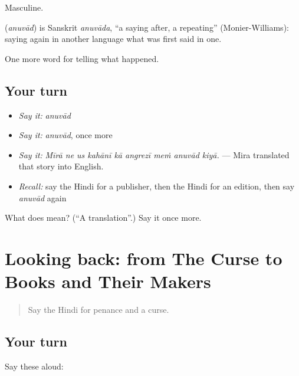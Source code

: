 Masculine.

\begin{cousinweb}
\textbf{} (\emph{anuvād}) is Sanskrit \emph{anuvāda}, \textquotedblleft{}a saying after, a repeating\textquotedblright{} (Monier-Williams): saying again in another language what was first said in one.
\end{cousinweb}

\begin{grammarlens}[title={What you've built}]
One more word for telling what happened.
\end{grammarlens}

\subsection*{Your turn}
\begin{itemize}
\raggedright
  \item \emph{Say it:} \emph{anuvād}
  \item \emph{Say it:} \emph{anuvād}, once more
  \item \emph{Say it:} \emph{Mīrā ne us kahānī kā angrezī meṁ anuvād kiyā.} — Mira translated that story into English.
  \item \emph{Recall:} say the Hindi for a publisher, then the Hindi for an edition, then say \emph{anuvād} again
\end{itemize}

\begin{tcolorbox}[breakable,colback=teal!4,colframe=teal!35!black,title={Before you move on}]
What does  mean? (\textquotedblleft{}A translation\textquotedblright{}.) Say it once more.
\end{tcolorbox}
\section[(dialogue)]{Looking back: from The Curse to Books and Their Makers}

\label{lesson:HI-R342-review-336-342}



\begin{quote}
Say the Hindi for penance and a curse.
\end{quote}

\subsection*{Your turn}
Say these aloud:

